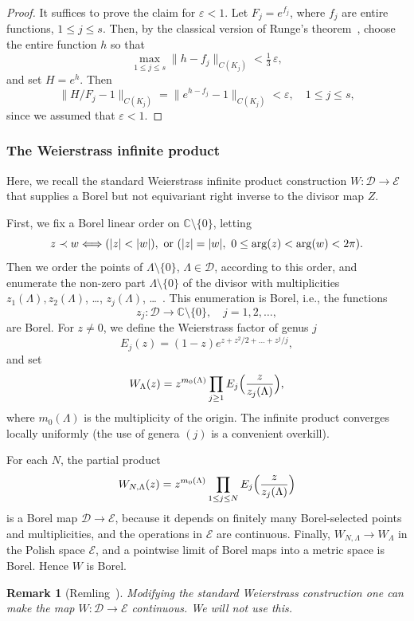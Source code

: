 \documentclass[11pt]{paper}
\newtheorem*{remark*}{Remark}
\newcommand{\bC}{\mathbb C}
\newcommand{\cE}{\mathcal E}
\newcommand{\cD}{\mathcal D}
\newcommand{\eps}{\varepsilon}
\begin{document}
\begin{proof}
It suffices to prove the claim for $\eps<1$.
Let $F_j=e^{f_j}$, where $f_j$ are entire functions, $1\le j \le s$. Then, by the classical version of Runge's
theorem~\cite[XIII.1]{Gamelin}, choose the entire function $h$ so that
\[
\max_{1\le j \le s}\lVert h - f_j \rVert_{C(K_j)} <\tfrac13\, \eps,
\]
and set $H=e^h$. Then
\[
\lVert H/F_j-1 \rVert_{C(K_j)} = \lVert e^{h - f_j}-1 \rVert_{C(K_j)} < \eps,
\quad 1\le j \le s,
\]
since we assumed that  $\eps<1$.
\end{proof}

\subsubsection{The Weierstrass infinite product}
Here, we recall the standard Weierstrass infinite product construction $W\colon \cD\to \cE$
that supplies a Borel but not equivariant right inverse  to the divisor map $Z$.

First, we fix a Borel linear order on $\bC\setminus \{0\}$, letting
\[
z \prec w \Longleftrightarrow (|z|<|w|), \ {\rm or} \ (|z|=|w|, \ 0\le \arg(z)<\arg(w)<2\pi).
\]
Then we order the points of $\Lambda\setminus \{0\}$, $\Lambda\in\cD$,
according to this order, and enumerate the non-zero part $\Lambda\setminus\{0\}$
of the divisor with multiplicities
$ z_1 (\Lambda), z_2(\Lambda)$, \ldots , $z_j(\Lambda)$, \dots\, .
This enumeration  is Borel, i.e., the functions
\[
z_j\colon \cD \to \bC\setminus \{0\}, \quad j=1, 2, \ldots ,
\]
are Borel. For $z\ne 0$, we define the Weierstrass factor of genus $j$
\[
E_j(z) = (1-z) e^{z+z^2/2 + \ldots + z^j/j},
\]
and set
\[
W_\Lambda (z) = z^{m_0(\Lambda)} \prod_{j\ge 1} E_j \Bigl( \frac{z}{z_j(\Lambda)}\Bigr),
\]
where $m_0(\Lambda)$ is the multiplicity of the origin. The infinite product
converges locally uniformly (the use of genera $(j)$ is a convenient overkill).

For each $N$, the partial product
\[
W_{N, \Lambda} (z) = z^{m_0(\Lambda)} \prod_{1\le j\le N}
E_j \Bigl( \frac{z}{z_j(\Lambda)}\Bigr)
\]
is a Borel map $\cD\to\cE$,
because it depends on finitely many Borel-selected points and multiplicities, and the operations in
$\cE$ are continuous. Finally,
$W_{N, \Lambda}\to W_\Lambda$ in the Polish space $\cE$, and a pointwise limit of Borel maps
into a metric space is Borel. Hence $W$ is Borel.

\begin{remark*}[Remling~\cite{Remling}]
{\em Modifying the standard Weierstrass construction one can make the map
$W\colon \cD\to\cE$ continuous. We will not use this.
}
\end{remark*}
\end{document}
